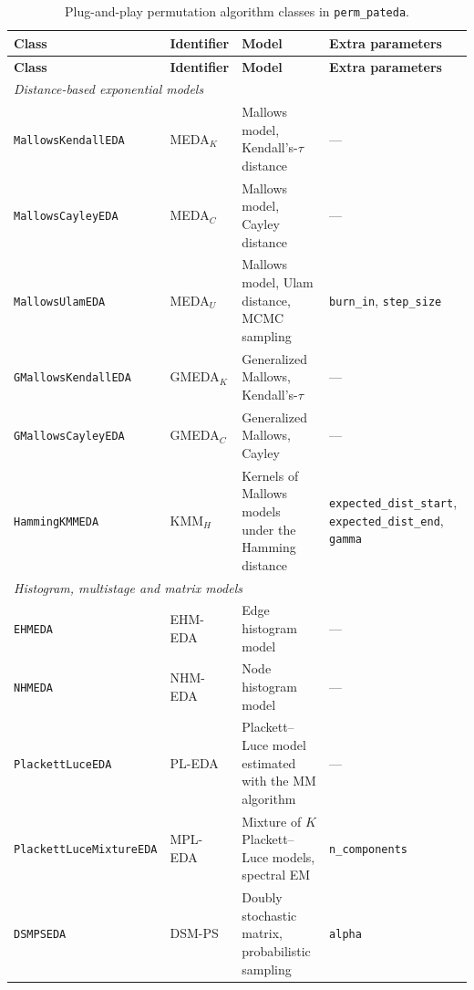 \documentclass[a4paper,11pt]{article}
\begin{document}
\begin{center}
\footnotesize
\setlength{\tabcolsep}{4pt}
\begin{longtable}{llp{5.0cm}p{3.0cm}}
\caption{Plug-and-play permutation algorithm classes in \texttt{perm\_pateda}.}
\label{tab:perm_algs}\\
\toprule
\textbf{Class} & \textbf{Identifier} & \textbf{Model} & \textbf{Extra parameters} \\
\midrule
\endfirsthead
\toprule
\textbf{Class} & \textbf{Identifier} & \textbf{Model} & \textbf{Extra parameters} \\
\midrule
\endhead
\multicolumn{4}{l}{\emph{Distance-based exponential models}}\\
\texttt{MallowsKendallEDA}   & MEDA$_K$   & Mallows model, Kendall's-$\tau$ distance \citep{Ceberio_et_al:2011} & --- \\
\texttt{MallowsCayleyEDA}    & MEDA$_C$   & Mallows model, Cayley distance \citep{Irurozki_et_al:2016} & --- \\
\texttt{MallowsUlamEDA}      & MEDA$_U$   & Mallows model, Ulam distance, MCMC sampling \citep{Irurozki_et_al:2014} & \texttt{burn\_in}, \texttt{step\_size} \\
\texttt{GMallowsKendallEDA}  & GMEDA$_K$  & Generalized Mallows, Kendall's-$\tau$ \citep{Ceberio_et_al:2014} & --- \\
\texttt{GMallowsCayleyEDA}   & GMEDA$_C$  & Generalized Mallows, Cayley \citep{Ceberio_et_al:2014b} & --- \\
\texttt{HammingKMMEDA}       & KMM$_H$    & Kernels of Mallows models under the Hamming distance \citep{Arza_et_al:2020} & \texttt{expected\_dist\_start}, \texttt{expected\_dist\_end}, \texttt{gamma} \\
\midrule
\multicolumn{4}{l}{\emph{Histogram, multistage and matrix models}}\\
\texttt{EHMEDA}              & EHM-EDA    & Edge histogram model \citep{Tsutsui:2002} & --- \\
\texttt{NHMEDA}              & NHM-EDA    & Node histogram model \citep{Tsutsui_et_al:2006} & --- \\
\texttt{PlackettLuceEDA}     & PL-EDA     & Plackett--Luce model estimated with the MM algorithm \citep{Ceberio_et_al:2013} & --- \\
\texttt{PlackettLuceMixtureEDA} & MPL-EDA & Mixture of $K$ Plackett--Luce models, spectral EM \citep{Nguyen_and_Zhang:2023} & \texttt{n\_components} \\
\texttt{DSMPSEDA}            & DSM-PS     & Doubly stochastic matrix, probabilistic sampling \citep{Santucci_and_Ceberio:2023} & \texttt{alpha} \\

\end{longtable}
\end{center}
\end{document}
